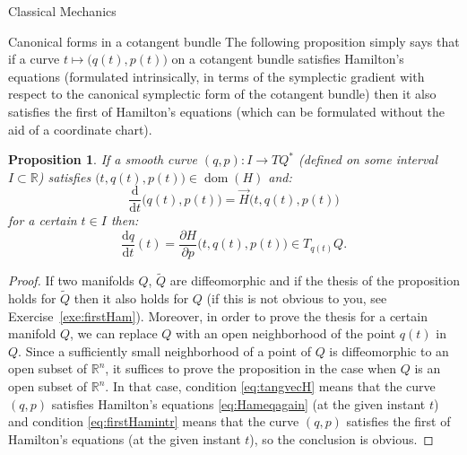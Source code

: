 \documentclass[oneside,a4paper,11pt]{amsbook}
\newcommand{\R}{\mathds R}
\newcommand{\dd}{\mathrm d}
\DeclareMathOperator{\Dom}{dom}
\theoremstyle{remark}\newtheorem{exercise}{Exercise}[chapter]
\theoremstyle{plain}\newtheorem{teo}{Theorem}[section]
\theoremstyle{plain}\newtheorem{lem}[teo]{Lemma}
\theoremstyle{plain}\newtheorem{prop}[teo]{Proposition}
\theoremstyle{plain}\newtheorem{cor}[teo]{Corollary}
\theoremstyle{definition}\newtheorem{defin}[teo]{Definition}
\theoremstyle{remark}\newtheorem{rem}[teo]{Remark}
\theoremstyle{definition}\newtheorem{notation}[teo]{Notation}
\theoremstyle{definition}\newtheorem{convention}[teo]{Convention}
\theoremstyle{definition}\newtheorem{example}[teo]{Example}
\numberwithin{section}{chapter}
\numberwithin{equation}{section}
\begin{document}
\begin{chapter}{Classical Mechanics}
\begin{section}{Canonical forms in a cotangent bundle}
The following proposition simply says that if a curve
$t\mapsto\big(q(t),p(t)\big)$ on a cotangent bundle satisfies Hamilton's equations (formulated intrinsically,
in terms of the symplectic gradient with respect to the canonical symplectic form of the cotangent bundle) then it also
satisfies the first of Hamilton's equations (which can be formulated without the aid of a coordinate chart).
\begin{prop}\label{thm:firstHam}
If a smooth curve $(q,p):I\to TQ^*$ (defined on some interval $I\subset\R$) satisfies $\big(t,q(t),p(t)\big)\in\Dom(H)$ and:
\begin{equation}\label{eq:tangvecH}
\frac{\dd}{\dd t}\big(q(t),p(t)\big)=\vec H\big(t,q(t),p(t)\big)
\end{equation}
for a certain $t\in I$ then:
\begin{equation}\label{eq:firstHamintr}
\frac{\dd q}{\dd t}(t)=\frac{\partial H}{\partial p}\big(t,q(t),p(t)\big)\in T_{q(t)}Q.
\end{equation}
\end{prop}
\begin{proof}
If two manifolds $Q$, $\widetilde Q$ are diffeomorphic and if the thesis of the proposition holds for $\widetilde Q$ then it also holds for $Q$
(if this is not obvious to you, see Exercise~\ref{exe:firstHam}). Moreover, in order to prove the thesis for a certain manifold $Q$, we can replace $Q$
with an open neighborhood of the point $q(t)$ in $Q$. Since a sufficiently small neighborhood of a point of $Q$ is diffeomorphic to an open subset of $\R^n$,
it suffices to prove the proposition in the case when $Q$ is an open subset of $\R^n$. In that case, condition \eqref{eq:tangvecH}
means that the curve $(q,p)$ satisfies Hamilton's equations \eqref{eq:Hameqagain}
(at the given instant $t$) and condition \eqref{eq:firstHamintr} means that the curve $(q,p)$
satisfies the first of Hamilton's equations (at the given instant $t$), so the conclusion is obvious.
\end{proof}


\end{section}
\end{chapter}
\end{document}
